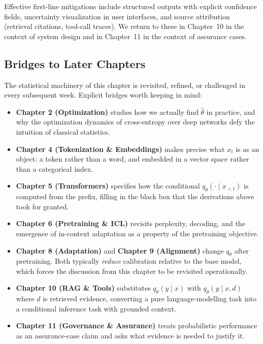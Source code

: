 Effective first-line mitigations include structured outputs with explicit confidence fields, uncertainty visualization in user interfaces, and source attribution (retrieval citations, tool-call traces). We return to these in Chapter~10 in the context of system design and in Chapter~11 in the context of assurance cases.

\subsection{Bridges to Later Chapters}

The statistical machinery of this chapter is revisited, refined, or challenged in every subsequent week. Explicit bridges worth keeping in mind:
\begin{itemize}
  \item \textbf{Chapter 2 (Optimization)} studies how we actually find $\hat\theta$ in practice, and why the optimization dynamics of cross-entropy over deep networks defy the intuition of classical statistics.
  \item \textbf{Chapter 4 (Tokenization \& Embeddings)} makes precise what $x_t$ is as an object: a token rather than a word, and embedded in a vector space rather than a categorical index.
  \item \textbf{Chapter 5 (Transformers)} specifies how the conditional $q_\theta(\cdot \mid x_{<t})$ is computed from the prefix, filling in the black box that the derivations above took for granted.
  \item \textbf{Chapter 6 (Pretraining \& ICL)} revisits perplexity, decoding, and the emergence of in-context adaptation as a property of the pretraining objective.
  \item \textbf{Chapter 8 (Adaptation)} and \textbf{Chapter 9 (Alignment)} change $q_\theta$ after pretraining. Both typically \emph{reduce} calibration relative to the base model, which forces the discussion from this chapter to be revisited operationally.
  \item \textbf{Chapter 10 (RAG \& Tools)} substitutes $q_\theta(y \mid x)$ with $q_\theta(y \mid x, d)$ where $d$ is retrieved evidence, converting a pure language-modelling task into a conditional inference task with grounded context.
  \item \textbf{Chapter 11 (Governance \& Assurance)} treats probabilistic performance as an assurance-case claim and asks what evidence is needed to justify it.
\end{itemize}

